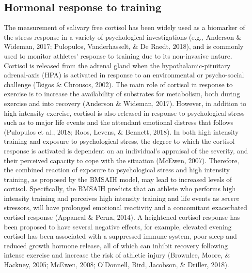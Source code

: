 \documentclass[
  english,
  man,floatsintext]{apa6}
\begin{document}
\hypertarget{hormonal-response-to-training}{%
\subsection{Hormonal response to training}\label{hormonal-response-to-training}}

The measurement of salivary free cortisol has been widely used as a biomarker of the stress response in a variety of psychological investigations (e.g., Anderson \& Wideman, 2017; Pulopulos, Vanderhasselt, \& De Raedt, 2018), and is commonly used to monitor athletes' response to training due to its non-invasive nature.
Cortisol is released from the adrenal gland when the hypothalamic-pituitary adrenal-axis (HPA) is activated in response to an environmental or psycho-social challenge (Tsigos \& Chrousos, 2002).
The main role of cortisol in response to exercise is to increase the availability of substrates for metabolism, both during exercise and into recovery (Anderson \& Wideman, 2017).
However, in addition to high intensity exercise, cortisol is also released in response to psychological stress such as to major life events and the attendant emotional distress that follows (Pulopulos et al., 2018; Roos, Levens, \& Bennett, 2018).
In both high intensity training and exposure to psychological stress, the degree to which the cortisol response is activated is dependent on an individual's appraisal of the severity, and their perceived capacity to cope with the situation (McEwen, 2007).
Therefore, the combined reaction of exposure to psychological stress and high intensity training, as proposed by the BMSAIH model, may lead to increased levels of cortisol.
Specifically, the BMSAIH predicts that an athlete who performs high intensity training and perceives high intensity training and life events as \emph{severe} stressors, will have prolonged emotional reactivity and a concomitant exacerbated cortisol response (Appaneal \& Perna, 2014).
A heightened cortisol response has been proposed to have several negative effects, for example, elevated evening cortisol has been associated with a suppressed immune system, poor sleep and reduced growth hormone release, all of which can inhibit recovery following intense exercise and increase the risk of athletic injury (Brownlee, Moore, \& Hackney, 2005; McEwen, 2008; O'Donnell, Bird, Jacobson, \& Driller, 2018).
\end{document}
